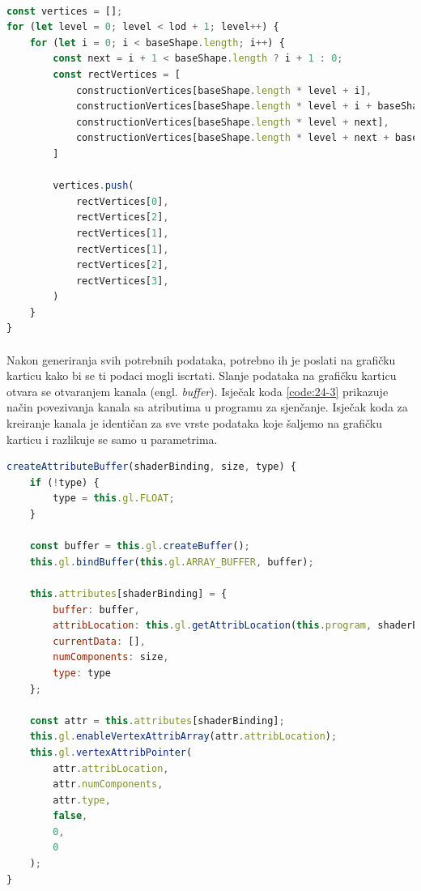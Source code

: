 \documentclass[times, utf8, diplomski]{fer}
\begin{document}
\paragraph{}
\begin{lstlisting}[language=Javascript,caption=Generiranje lica od gradivnih točaka,label=code24-2]
const vertices = [];
for (let level = 0; level < lod + 1; level++) {
    for (let i = 0; i < baseShape.length; i++) {
        const next = i + 1 < baseShape.length ? i + 1 : 0;
        const rectVertices = [
            constructionVertices[baseShape.length * level + i],
            constructionVertices[baseShape.length * level + i + baseShape.length],
            constructionVertices[baseShape.length * level + next],
            constructionVertices[baseShape.length * level + next + baseShape.length]
        ]

        vertices.push(
            rectVertices[0],
            rectVertices[2],
            rectVertices[1],
            rectVertices[1],
            rectVertices[2],
            rectVertices[3],
        )
    }
}
\end{lstlisting}

\paragraph{}
Nakon generiranja svih potrebnih podataka, potrebno ih je poslati na grafičku karticu kako bi se ti podaci mogli iscrtati. Slanje podataka na grafičku karticu otvara se otvaranjem kanala (engl. \textit{buffer}). Isječak koda \ref{code:24-3} prikazuje način povezivanja kanala sa atributima u programu za sjenčanje. Isječak koda za kreiranje kanala je identičan za sve vrste podataka koje šaljemo na grafičku karticu i razlikuje se samo u parametrima.

\begin{lstlisting}[language=Javascript,caption=Kreiranje kanala za slanje podataka prema grafičkoj kartici ,label=code24-3]
createAttributeBuffer(shaderBinding, size, type) {
    if (!type) {
        type = this.gl.FLOAT;
    }
    
    const buffer = this.gl.createBuffer();
    this.gl.bindBuffer(this.gl.ARRAY_BUFFER, buffer);
    
    this.attributes[shaderBinding] = {
        buffer: buffer,
        attribLocation: this.gl.getAttribLocation(this.program, shaderBinding),
        currentData: [],
        numComponents: size,
        type: type
    };
    
    const attr = this.attributes[shaderBinding];
    this.gl.enableVertexAttribArray(attr.attribLocation);
    this.gl.vertexAttribPointer(
        attr.attribLocation,
        attr.numComponents,
        attr.type,
        false,
        0,
        0
    );
}
\end{lstlisting}
\end{document}
